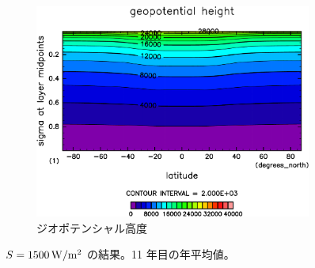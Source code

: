 \documentclass[body]{subfiles}
\begin{document}
\begin{figure}[t]
\begin{subfigure}{.4\textwidth}
		\includegraphics[width=\columnwidth]{S1500/Height,time=3650:4015-crop-rotate.pdf}
		\caption{ジオポテンシャル高度}
	\end{subfigure}
	\caption{
		\(S=1500\hmu{W/m^2}\) の結果。11 年目の年平均値。
	}\label{S1500}
\end{figure}
\end{document}
